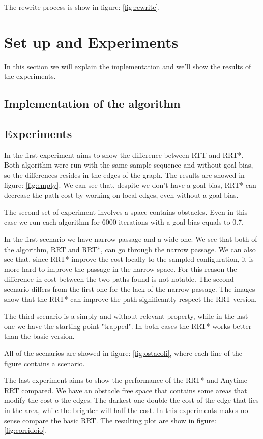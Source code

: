 \documentclass[10pt]{article}
\begin{document}
	The rewrite process is show in figure: \ref{fig:rewrite}.

	
	\section{Set up and Experiments}
	In this section we will explain the implementation and we'll show the results of the experiments.
	\subsection{Implementation of the algorithm}
	\subsection{Experiments}
	
	In the first experiment aims to show the difference between RTT and RRT*. Both algorithm were run with the same sample sequence and without goal bias, so the differences resides in the edges of the graph. The results are showed in figure: \ref{fig:empty}. We can see that, despite we don't have a goal bias, RRT* can decrease the path cost by working on local edges, even without a goal bias.
	
	The second set of experiment involves a space contains obstacles. Even in this case we run each algorithm for 6000 iterations with a goal bias equals to 0.7.
	
	In the first scenario we have narrow passage and a wide one. We see that both of the algorithm, RRT and RRT*, can go through the narrow passage. We can also see that, since RRT* improve the cost locally to the sampled configuration, it is more hard to improve the passage in the narrow space. For this reason the difference in cost between the two paths found is not notable. The second scenario differs from the first one for the lack of the narrow passage. The images show that the RRT* can improve the path significantly respect the RRT version.
	
	The third scenario is a simply and without relevant property, while in the last one we have the starting point "trapped". In both cases the RRT* works better than the basic version.
	
	All of the scenarios are showed in figure: \ref{fig:ostacoli}, where each line of the figure contains a scenario.
	
	The last experiment aims to show the performance of the RRT* and Anytime RRT compared. We have an obstacle free space that contains some areas that modify the cost o the edges. The darkest one double the cost of the edge that lies in the area, while the brighter will half the cost. In this experiments makes no sense compare the basic RRT. The resulting plot are show in figure: \ref{fig:corridoio}. 
	
\end{document}

